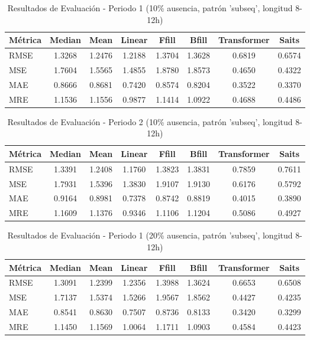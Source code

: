 \begin{table}[htbp]
\centering
\caption{Resultados de Evaluación - Periodo 1 (10\% ausencia, patrón 'subseq', longitud 8-12h)}
\label{tab:poqueira_10_subseq_per1}
\begin{tabular}{l*{7}{S[table-format=1.4]}}
\toprule
\textbf{Métrica} & \textbf{Median} & \textbf{Mean} & \textbf{Linear} & \textbf{Ffill} & \textbf{Bfill} & \textbf{Transformer} & \textbf{Saits} \\
\midrule
RMSE & 1.3268 & 1.2476 & 1.2188 & 1.3704 & 1.3628 & 0.6819 & 0.6574 \\
MSE  & 1.7604 & 1.5565 & 1.4855 & 1.8780 & 1.8573 & 0.4650 & 0.4322 \\
MAE  & 0.8666 & 0.8681 & 0.7420 & 0.8574 & 0.8204 & 0.3522 & 0.3370 \\
MRE  & 1.1536 & 1.1556 & 0.9877 & 1.1414 & 1.0922 & 0.4688 & 0.4486 \\
\bottomrule
\end{tabular}
\end{table}

\begin{table}[htbp]
\centering
\caption{Resultados de Evaluación - Periodo 2 (10\% ausencia, patrón 'subseq', longitud 8-12h)}
\label{tab:poqueira_10_subseq_per2}
\begin{tabular}{l*{7}{S[table-format=1.4]}}
\toprule
\textbf{Métrica} & \textbf{Median} & \textbf{Mean} & \textbf{Linear} & \textbf{Ffill} & \textbf{Bfill} & \textbf{Transformer} & \textbf{Saits} \\
\midrule
RMSE & 1.3391 & 1.2408 & 1.1760 & 1.3823 & 1.3831 & 0.7859 & 0.7611 \\
MSE  & 1.7931 & 1.5396 & 1.3830 & 1.9107 & 1.9130 & 0.6176 & 0.5792 \\
MAE  & 0.9164 & 0.8981 & 0.7378 & 0.8742 & 0.8819 & 0.4015 & 0.3890 \\
MRE  & 1.1609 & 1.1376 & 0.9346 & 1.1106 & 1.1204 & 0.5086 & 0.4927 \\
\bottomrule
\end{tabular}
\end{table}

\begin{table}[htbp]
\centering
\caption{Resultados de Evaluación - Periodo 1 (20\% ausencia, patrón 'subseq', longitud 8-12h)}
\label{tab:poqueira_20_subseq_per1}
\begin{tabular}{l*{7}{S[table-format=1.4]}}
\toprule
\textbf{Métrica} & \textbf{Median} & \textbf{Mean} & \textbf{Linear} & \textbf{Ffill} & \textbf{Bfill} & \textbf{Transformer} & \textbf{Saits} \\
\midrule
RMSE & 1.3091 & 1.2399 & 1.2356 & 1.3988 & 1.3624 & 0.6653 & 0.6508 \\
MSE  & 1.7137 & 1.5374 & 1.5266 & 1.9567 & 1.8562 & 0.4427 & 0.4235 \\
MAE  & 0.8541 & 0.8630 & 0.7507 & 0.8736 & 0.8133 & 0.3420 & 0.3299 \\
MRE  & 1.1450 & 1.1569 & 1.0064 & 1.1711 & 1.0903 & 0.4584 & 0.4423 \\
\bottomrule
\end{tabular}
\end{table}

